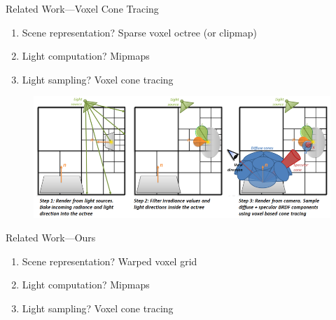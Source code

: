 \documentclass[10pt]{beamer}
\begin{document}
\begin{frame}{Related Work---Voxel Cone Tracing}
  \begin{enumerate}
    \item Scene representation? \alert{Sparse voxel octree (or clipmap)}%
    \item Light computation? \alert{Mipmaps} %
    \item Light sampling? \alert{Voxel cone tracing} %
  \end{enumerate}

  \begin{figure}
    \includegraphics[width=\textwidth]{vct}
  \end{figure}


\end{frame}

\begin{frame}{Related Work---Ours}
  \begin{enumerate}
    \item Scene representation? \alert{Warped voxel grid} %
    \item Light computation? \alert{Mipmaps} %
    \item Light sampling? \alert{Voxel cone tracing} %
  \end{enumerate}


\end{frame}
\end{document}
